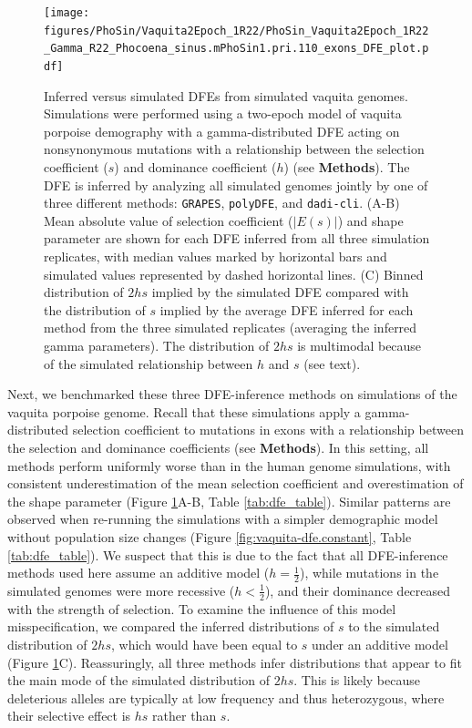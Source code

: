 \documentclass[hidelinks]{article}
\newcommand{\polydfe}{\texttt{polyDFE}\xspace}
\newcommand{\dadicli}{\texttt{dadi-cli}\xspace}
\newcommand{\grapes}{\texttt{GRAPES}\xspace}
\begin{document}
    \begin{figure}[b!]
        \centering
        \texttt{[image: figures/PhoSin/Vaquita2Epoch\_1R22/PhoSin\_Vaquita2Epoch\_1R22\_Gamma\_R22\_Phocoena\_sinus.mPhoSin1.pri.110\_exons\_DFE\_plot.pdf]}
        \caption{
        \label{fig:vaquita-dfe}
        Inferred versus simulated DFEs from simulated vaquita genomes.
        Simulations were performed using a two-epoch model of vaquita porpoise demography with a gamma-distributed DFE
        acting on nonsynonymous mutations with a relationship between the selection coefficient ($s$) and dominance coefficient ($h$) (see \textbf{Methods}).
        The DFE is inferred by analyzing all simulated genomes jointly by one of three different methods:
        \grapes, \polydfe, and \dadicli.
        (A-B) Mean absolute value of selection coefficient ($\lvert E(s) \rvert $) and shape parameter are
        shown for each DFE inferred from all three simulation replicates,
        with median values marked by horizontal bars
        and simulated values represented by dashed horizontal lines.
        (C) Binned distribution of $2hs$ implied by the simulated DFE compared with
        the distribution of $s$ implied by the average DFE inferred for each method from the three simulated replicates (averaging the inferred gamma parameters).
        The distribution of $2 h s$ is multimodal because of the simulated relationship between $h$ and $s$ (see text).
        }
    \end{figure}

    Next, we benchmarked these three DFE-inference methods on simulations of the vaquita porpoise genome.
    Recall that these simulations apply a gamma-distributed selection coefficient to mutations in exons
    with a relationship between the selection and dominance coefficients (see \textbf{Methods}).
    In this setting, all methods perform uniformly worse than in the human genome simulations,
    with consistent underestimation of the mean selection coefficient
    and overestimation of the shape parameter (Figure \ref{fig:vaquita-dfe}A-B, Table \ref{tab:dfe_table}).
    Similar patterns are observed when re-running the simulations with a simpler demographic model
    without population size changes (Figure \ref{fig:vaquita-dfe.constant}, Table \ref{tab:dfe_table}).
    We suspect that this is due to the fact that all DFE-inference methods used here assume an additive model ($h = \frac{1}{2}$),
    while mutations in the simulated genomes were more recessive ($h < \frac{1}{2}$), and their dominance decreased with the strength of selection.
    To examine the influence of this model misspecification, we compared the inferred distributions of $s$ to the
    simulated distribution of $2hs$, which would have been equal to $s$ under an additive model (Figure \ref{fig:vaquita-dfe}C).
    Reassuringly, all three methods infer distributions that appear to fit the main mode of the simulated distribution of $2hs$.
    This is likely because deleterious alleles are typically at low frequency and thus heterozygous,
    where their selective effect is $h s$ rather than $s$.
\end{document}
